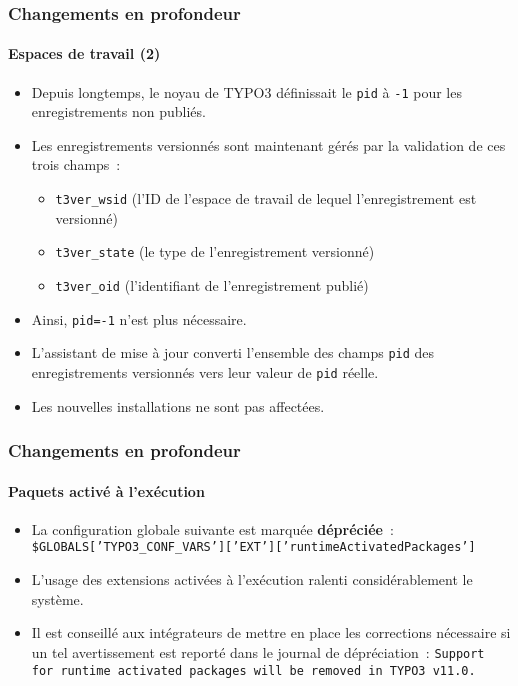 
\begin{frame}[fragile]
	\frametitle{Changements en profondeur}
	\framesubtitle{Espaces de travail (2)}

	\begin{itemize}
		\item Depuis longtemps, le noyau de TYPO3 définissait le \texttt{pid} à \texttt{-1} pour les enregistrements non publiés.
		\item Les enregistrements versionnés sont maintenant gérés par la validation de ces trois champs~:

			\begin{itemize}
				\item \texttt{t3ver\_wsid} (l'ID de l'espace de travail de lequel l'enregistrement est versionné)
				\item \texttt{t3ver\_state} (le type de l'enregistrement versionné)
				\item \texttt{t3ver\_oid} (l'identifiant de l'enregistrement publié)
			\end{itemize}

		\item Ainsi, \texttt{pid=-1} n'est plus nécessaire.
		\item L'assistant de mise à jour converti l'ensemble des champs \texttt{pid} des enregistrements versionnés
			vers leur valeur de \texttt{pid} réelle.
		\item Les nouvelles installations ne sont pas affectées.

	\end{itemize}

\end{frame}


\begin{frame}[fragile]
	\frametitle{Changements en profondeur}
	\framesubtitle{Paquets activé à l'exécution}

	\begin{itemize}
		\item La configuration globale suivante est marquée \textbf{dépréciée}~:\newline
			\smaller
				\texttt{\$GLOBALS['TYPO3\_CONF\_VARS']['EXT']['runtimeActivatedPackages']}
			\normalsize
		\item L'usage des extensions activées à l'exécution ralenti considérablement le système.
		\item Il est conseillé aux intégrateurs de mettre en place les corrections nécessaire si un tel avertissement
			est reporté dans le journal de dépréciation~:\newline
			\begingroup
				\fontsize{8}{10}
				\texttt{Support for runtime activated packages will be removed in TYPO3 v11.0.}
			\endgroup

	\end{itemize}

\end{frame}

